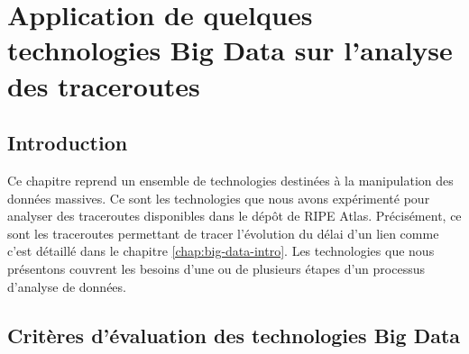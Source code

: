 \chapter{Application de quelques technologies Big Data sur l'analyse des traceroutes} \label{chap:application-on-traceroutes}


\section{Introduction}

Ce chapitre reprend un ensemble de   technologies destinées  à la manipulation des données massives. Ce sont les technologies que nous avons expérimenté pour analyser des traceroutes disponibles dans le dépôt de RIPE Atlas. Précisément, ce sont les traceroutes permettant de tracer l'évolution du délai d'un lien comme c'est détaillé dans le chapitre \ref{chap:big-data-intro}.
Les technologies que nous présentons  couvrent les besoins d'une ou de plusieurs étapes d'un processus d'analyse de données.
 

\section{Critères d'évaluation des technologies  Big Data}

